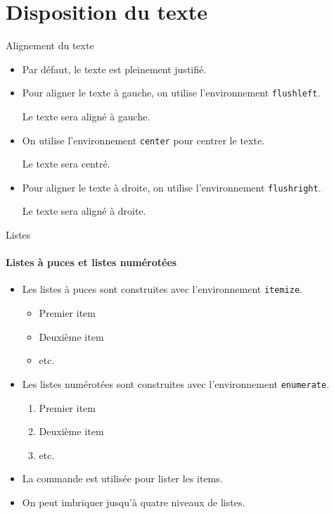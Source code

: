 \section{Disposition du texte}

\begin{frame}[fragile]{Alignement du texte}
	\begin{itemize}
		\item Par défaut, le texte est pleinement justifié.
		\item Pour aligner le texte à gauche, on utilise l'environnement \texttt{flushleft}.
\begin{codesource}
\begin{flushleft}
	Le texte sera aligné à gauche.
\end{flushleft}
\end{codesource}
		\item On utilise l'environnement \texttt{center} pour centrer le texte.
\begin{codesource}
	\begin{center}
		Le texte sera centré.
	\end{center}
\end{codesource}
		\item Pour aligner le texte à droite, on utilise l'environnement \texttt{flushright}.
\begin{codesource}
	\begin{flushright}
		Le texte sera aligné à droite.
	\end{flushright}
\end{codesource}
	\end{itemize}
\end{frame}

\begin{frame}[fragile]{Listes}
	\framesubtitle{Listes à puces et listes numérotées}
	\begin{itemize}
		\item Les listes à puces sont construites avec l'environnement \texttt{itemize}.
\begin{codesource}
	\begin{itemize}
		\item Premier item
		\item Deuxième item
		\item etc.
	\end{itemize}
\end{codesource}
		\item Les listes numérotées sont construites avec l'environnement \texttt{enumerate}.
\begin{codesource}
	\begin{enumerate}
		\item Premier item
		\item Deuxième item
		\item etc.
	\end{enumerate}
\end{codesource}
		\item La commande  est utilisée pour lister les items.
		\item On peut imbriquer jusqu'à quatre niveaux de listes.
	\end{itemize}
\end{frame}


